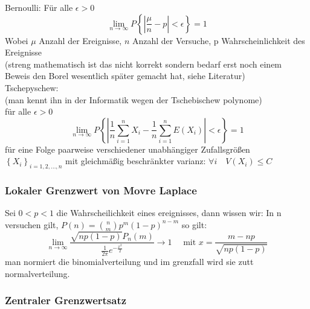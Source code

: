 \documentclass[a4paper]{article}
\theoremstyle{definition}
\theoremstyle{remark}
\begin{document}
Bernoulli: Für alle $\epsilon > 0 $ 
\begin{equation}
  \lim_{n \rightarrow \infty}P\left\{|\frac{\mu}{n}-p|<\epsilon \right\}=1
\end{equation}
 Wobei $\mu$ Anzahl der Ereignisse, $n$ Anzahl der Versuche, p Wahrscheinlichkeit des Ereignisse\\
 (streng mathematisch ist das nicht korrekt sondern bedarf erst noch einem Beweis den Borel wesentlich später gemacht hat, siehe Literatur)\\
 Tschepyschew:\\
 (man kennt ihn in der Informatik wegen der Tschebischew polynome)\\
für alle $\epsilon >0$ 
\begin{equation}
  \lim_{n\rightarrow \infty}P\left\{ |\frac{1}{n}\sum_{i=1}^{n}X_i-\frac{1}{n}\sum_{i=1}^{n}E(X_i)|<\epsilon  \right\}=1
\end{equation}
für eine Folge paarweise verschiedener unabhängiger Zufallsgrößen
  $\left\{ X_i \right\}_{i=1,2,\dots,n}$
mit gleichmäßig beschränkter varianz:
 $ \forall i \quad V(X_i)\leq C$
\subsubsection{Lokaler Grenzwert von Movre Laplace}
\label{ssub:lokaler_grenzwert_von_movre_laplace}

Sei $0<p<1$ die Wahrscheilichkeit eines ereignisses, dann wissen wir: In n versuchen gilt, $P(n)= \binom{n}{m}p^m(1-p)^{n-m}$ so gilt:\\
\begin{equation}
\lim_{n\rightarrow \infty} \frac{\sqrt{np(1-p)}P_n(m)}{\frac{1}{2\pi}e^{-\frac{x^2}{2}}}\rightarrow 1 \quad \textrm{ mit  }x= \frac{m-np}{\sqrt{np(1-p)}}
\end{equation}
man normiert die binomialverteilung und im grenzfall wird sie zutt normalverteilung.
\subsubsection{Zentraler Grenzwertsatz}
\label{ssub:zentraler_grenzwertsatz}
\end{document}
